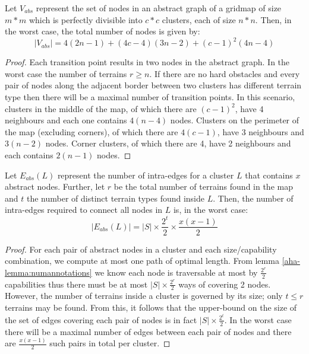 \begin{lemma}
\label{aha-lemma:maxnodes}
Let $V_{abs}$ represent the set of nodes in an abstract graph of a gridmap of size $m*m$ which is perfectly divisible into $c*c$ clusters, each of size $n*n$. Then, in the worst case, the total number of nodes is given by:
$$|V_{abs}| = 4(2n-1) + (4c - 4)(3n-2) + (c-1)^2(4n-4)$$
\end{lemma}

\begin{proof}
Each transition point results in two nodes in the abstract graph. 
In the worst case the number of terrains $r \geq n$. 
If there are no hard obstacles and every pair of nodes along the adjacent border between two clusters has different terrain type then there will be a maximal number of transition points. 
In this scenario, clusters in the middle of the map, of which there are $(c-1)^2$, have 4 neighbours and each one contains $4(n-4)$ nodes. 
Clusters on the perimeter of the map (excluding corners), of which there are $4(c-1)$, have 3 neighbours and $3(n-2)$ nodes. 
Corner clusters, of which there are 4, have 2 neighbours and each contains $2(n-1)$ nodes.
\end{proof}

\begin{lemma}
\label{aha-lemma:maxedgesincluster}
Let $E_{abs}(L)$ represent the number of intra-edges for a cluster $L$ that contains $x$ abstract nodes. Further, let $r$ be the total number of terrains found in the map and $t$ the number of distinct terrain types found inside $L$. Then, the number of intra-edges required to connect all nodes in $L$ is, in the worst case:
 $$|E_{abs}(L)| = |S|\times \frac{2^t}{2} \times \frac{x(x-1)}{2}$$
 \end{lemma}

\begin{proof}
For each pair of abstract nodes in a cluster and each size/capability combination, we compute at most one path of optimal length. 
From lemma \ref{aha-lemma:numannotations} we know each node is traversable at most by $\frac{2^r}{2}$ capabilities thus there must be at most $|S|\times \frac{2^r}{2}$ ways of covering 2 nodes. 
However, the number of terrains inside a cluster is governed by its size; only $t \leq r$ terrains may be found. 
From this, it follows that the upper-bound on the size of the set of edges covering each pair of nodes is in fact $|S| \times \frac{2^t}{2}$. 
In the worst case there will be a maximal number of edges between each pair of nodes and there are $\frac{x(x-1)}{2}$ such pairs in total per cluster. 
\end{proof}

